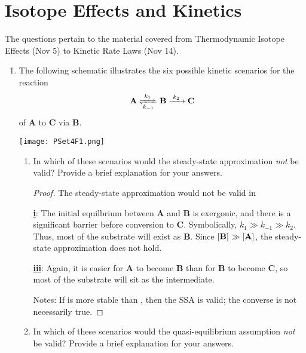 \documentclass[../psets.tex]{subfiles}
\begin{document}
\section{Isotope Effects and Kinetics}
The questions pertain to the material covered from Thermodynamic Isotope Effects (Nov 5) to Kinetic Rate Laws (Nov 14).
\begin{enumerate}
    \item The following schematic illustrates the six possible kinetic scenarios for the reaction
    \begin{equation*}
        \ce{\textbf{A} <=>[$k_1$][$k_{-1}$] \textbf{B} ->[$k_2$] \textbf{C}}
    \end{equation*}
    of \textbf{A} to \textbf{C} via \textbf{B}.
    \begin{center}
        \texttt{[image: PSet4F1.png]}
    \end{center}
    \begin{enumerate}
        \item In which of these scenarios would the steady-state approximation \emph{not} be valid? Provide a brief explanation for your answers.
        \begin{proof}
            The steady-state approximation would not be valid in \par
            \underline{\textbf{i}}: The initial equilbrium between \textbf{A} and \textbf{B} is exergonic, and there is a significant barrier before conversion to \textbf{C}. Symbolically, $k_1\gg k_{-1}\gg k_2$. Thus, most of the substrate will exist as \textbf{B}. Since $\cnc{\textbf{B}}\gg\cnc{\textbf{A}}$, the steady-state approximation does not hold.\par
            \underline{\textbf{iii}}: Again, it is easier for \textbf{A} to become \textbf{B} than for \textbf{B} to become \textbf{C}, so most of the substrate will sit as the intermediate.\par
            Notes: If  is more stable than , then the SSA is valid; the converse is not necessarily true.
        \end{proof}
        \item In which of these scenarios would the quasi-equilibrium assumption \emph{not} be valid? Provide a brief explanation for your answers.

\end{enumerate}
\end{enumerate}
\end{document}
